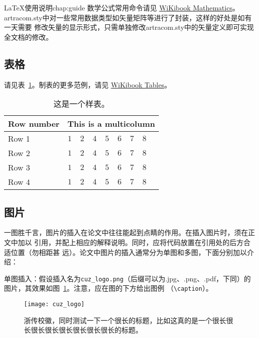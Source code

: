 \begin{cuzchapter}{\LaTeX{}使用说明}{chap:guide}
    数学公式常用命令请见
    \href{https://en.wikibooks.org/wiki/LaTeX/Mathematics}{WiKibook Mathematics}。
    artracom.sty中对一些常用数据类型如矢量矩阵等进行了封装，这样的好处是如有一天需要
    修改矢量的显示形式，只需单独修改artracom.sty中的矢量定义即可实现全文档的修改。

    \subsection{表格}\label{sub:tables}

    请见表~\ref{tab:sample}。制表的更多范例，请见
    \href{https://en.wikibooks.org/wiki/LaTeX/Tables}{WiKibook Tables}。
    \begin{table}[!htbp]
        \caption[样表]{这是一个样表。}
        \label{tab:sample}
        \centering
        \footnotesize%
        \setlength{\tabcolsep}{4pt}%
        \renewcommand{\arraystretch}{1.2}%
        \begin{tabular}{lcccccccc}
            \hline
            Row number & \multicolumn{8}{c}{This is a multicolumn}                                     \\
            \hline
            Row 1      & $1$                                       & $2$ & $4$ & $5$ & $6$ & $7$ & $8$ \\
            Row 2      & $1$                                       & $2$ & $4$ & $5$ & $6$ & $7$ & $8$ \\
            Row 3      & $1$                                       & $2$ & $4$ & $5$ & $6$ & $7$ & $8$ \\
            Row 4      & $1$                                       & $2$ & $4$ & $5$ & $6$ & $7$ & $8$ \\
            \hline
        \end{tabular}
    \end{table}

    \subsection{图片}\label{sub:images}

    一图胜千言，图片的插入在论文中往往能起到点睛的作用。在插入图片时，须在正文中加以
    引用，并配上相应的解释说明。同时，应将代码放置在引用处的后方合适位置（勿相距甚
    远）。论文中图片的插入通常分为单图和多图，下面分别加以介绍：

    单图插入：假设插入名为\verb|cuz_logo.png|（后缀可以为.jpg、.png、.pdf，下同）的
    图片，其效果如图~\ref{fig:cuz_logo}。注意，应在图的下方给出图例
    （\verb|\caption|）。
    \begin{figure}[h]
        \centering
        \texttt{[image: cuz\_logo]}
        \caption[浙传校徽]{浙传校徽，同时测试一下一个很长的标题，比如这真的是一个很长很长很长很长很长很长很长很长的标题。}
        \label{fig:cuz_logo}
    \end{figure}


\end{cuzchapter}
